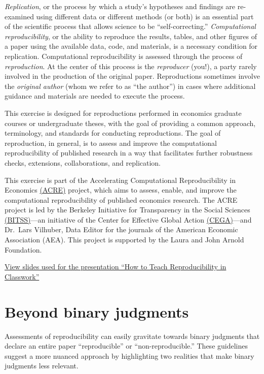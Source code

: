 \documentclass[]{book}
\begin{document}
\emph{Replication}, or the process by which a study's hypotheses and findings are re-examined using different data or different methods (or both) \citep{King95} is an essential part of the scientific process that allows science to be ``self-correcting.'' \emph{Computational reproducibility}, or the ability to reproduce the results, tables, and other figures of a paper using the available data, code, and materials, is a necessary condition for replication. Computational reproducibility is assessed through the process of \emph{reproduction}. At the center of this process is the \emph{reproducer} (you!), a party rarely involved in the production of the original paper. Reproductions sometimes involve the \emph{original author} (whom we refer to as ``the author'') in cases where additional guidance and materials are needed to execute the process.

This exercise is designed for reproductions performed in economics graduate courses or undergraduate theses, with the goal of providing a common approach, terminology, and standards for conducting reproductions. The goal of reproduction, in general, is to assess and improve the computational reproducibility of published research in a way that facilitates further robustness checks, extensions, collaborations, and replication.

This exercise is part of the Accelerating Computational Reproducibility in Economics \href{https://www.bitss.org/ecosystem/acre/}{(ACRE)} project, which aims to assess, enable, and improve the computational reproducibility of published economics research. The ACRE project is led by the Berkeley Initiative for Transparency in the Social Sciences \href{https://bitss.org}{(BITSS)}---an initiative of the Center for Effective Global Action \href{https://cega.berkeley.edu/}{(CEGA)}---and Dr.~Lars Vilhuber, Data Editor for the journals of the American Economic Association (AEA). This project is supported by the Laura and John Arnold Foundation.

\href{https://bitss.github.io/WEAI2020_slides/}{View slides used for the presentation ``How to Teach Reproducibility in Classwork''}

\hypertarget{beyond-binary-judgments}{%
\section*{Beyond binary judgments}\label{beyond-binary-judgments}}

Assessments of reproducibility can easily gravitate towards binary judgments that declare an entire paper ``reproducible'' or ``non-reproducible.'' These guidelines suggest a more nuanced approach by highlighting two realities that make binary judgments less relevant.
\end{document}
